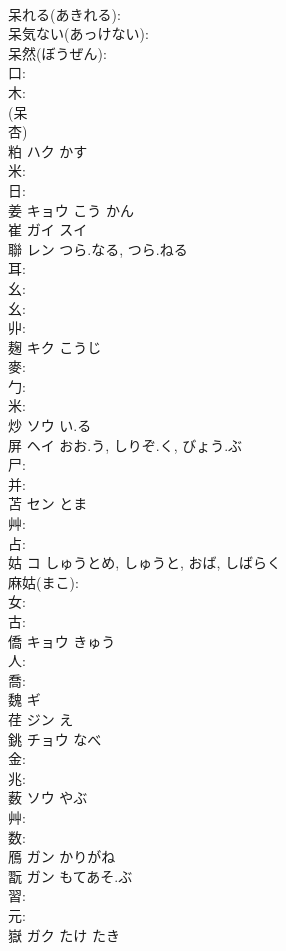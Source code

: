 \documentclass[8pt]{extreport}
\begin{document}
\begin{CJK}{UTF8}{min}
\\	呆れる(あきれる): 
\\	呆気ない(あっけない): 
\\	呆然(ぼうぜん): 
\\	口: 
\\	木: 
\\	(呆 
\\	杏) 
\\	粕	ハク	かす		
\\	米: 
\\	日: 
\\	姜	キョウ こう かん			
\\	崔	ガイ スイ			
\\	聯	レン	つら.なる, つら.ねる		
\\	耳: 
\\	幺: 
\\	幺: 
\\	丱: 
\\	麹	キク	こうじ		
\\	麥: 
\\	勹: 
\\	米: 
\\	炒	ソウ い.る			
\\	屏	ヘイ	おお.う, しりぞ.く, びょう.ぶ		
\\	尸: 
\\	并: 
\\	苫	セン	とま		
\\	艸: 
\\	占: 
\\	姑	コ	しゅうとめ, しゅうと, おば, しばらく		
\\	麻姑(まこ): 
\\	女: 
\\	古: 
\\	僑	キョウ		きゅう	
\\	人: 
\\	喬: 
\\	魏	ギ			
\\	荏	ジン え			
\\	銚	チョウ	なべ		
\\	金: 
\\	兆: 
\\	薮	ソウ	やぶ		
\\	艸: 
\\	数: 
\\	鴈	ガン かりがね			
\\	翫	ガン	もてあそ.ぶ				
\\	習: 
\\	元: 
\\	嶽	ガク	たけ	たき	

\end{CJK}
\end{document}
